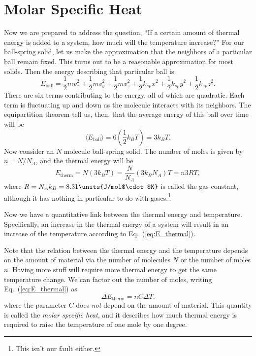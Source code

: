 \section{Molar Specific Heat}

Now we are prepared to address the question, ``If a certain amount of
thermal energy is added to a system, how much will the temperature
increase?''  For our ball-spring solid, let us make the approximation
that the neighbors of a particular ball remain fixed.  This turns out
to be a reasonable approximation for most solids.  Then the energy
describing that particular ball is
\begin{equation}
E_\text{ball} = {\textstyle\frac{1}{2}}mv_x^2 +
{\textstyle\frac{1}{2}}mv_y^2 + {\textstyle\frac{1}{2}}mv_z^2 +
{\textstyle\frac{1}{2}}k_{sp}x^2 + {\textstyle\frac{1}{2}}k_{sp}y^2 +
{\textstyle\frac{1}{2}}k_{sp}z^2.
\label{eq:ball-spring_energy}
\end{equation}
There are six terms contributing to the energy, all of which are
quadratic.  Each term is fluctuating up and down as the molecule
interacts with its neighbors.  The equipartition theorem tell us,
then, that the average energy of this ball over time will be
\begin{equation}
\langle E_\text{ball}\rangle = 6\left({\textstyle\frac{1}{2}}k_BT\right) = 3k_BT.
\end{equation}
Now consider an $N$ molecule ball-spring solid.  The number of moles
is given by $n = N/N_A$, and the 
thermal energy will be
\begin{equation}
E_\text{therm} = N (3 k_B T) = \frac{N}{N_A}(3k_BN_A)T = n3RT,
\label{eq:E_thermal}
\end{equation}
where $R=N_A k_B = 8.31\units{J/mol$\cdot$K}$ is called the gas
constant, although it has nothing in particular to do with
gases.\footnote{This isn't our fault either.}  

Now we have a quantitative link between the thermal energy and
temperature.  Specifically, an increase in the thermal energy of a
system will result in an increase of the temperature according to
Eq.~(\ref{eq:E_thermal}).  

Note that the relation between the thermal
energy and the temperature depends on the amount of material via the
number of molecules $N$ or the number of moles $n$. Having more stuff
will require more thermal energy to get the same temperature change.
We can factor out the number of moles, writing Eq.~(\ref{eq:E_thermal}) as
\begin{equation}
\Delta E_\text{therm} = n C \Delta T.
\end{equation}
where the parameter $C$ does {\it not} depend on the amount of material.
This quantity is called the {\it molar specific heat}, and it describes how
much thermal energy is required to raise the temperature of one mole by one
degree.  

